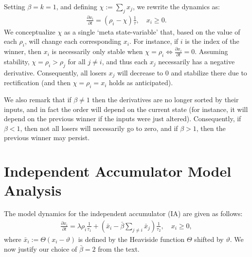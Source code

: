 \documentclass[a4paper]{article}
\begin{document}
Setting $\beta = k = 1$, and defining $\chi := \sum_j x_j$, we rewrite the dynamics as:
\begin{equation} \label{eq:um-special}
    \begin{split}
        \frac{{\partial x}_i}{\partial t} = \left(\rho_i - \chi \right) \frac{1}{\tau}, \quad x_i \ge 0.
    \end{split}
\end{equation}
We conceptualize $\chi$ as a single `meta state-variable' that, based on the value of each $\rho_i$, will change each corresponding $x_i$.
For instance, if $i$ is the index of the winner, then $x_i$ is necessarily only stable when $\chi = \rho_i \iff \frac{{\partial x}_i}{\partial t} = 0$.
Assuming stability, $\chi = \rho_i > \rho_j$ for all $j \ne i$, and thus each $x_j$ necessarily has a negative derivative.
Consequently, all losers $x_j$ will decrease to 0 and stabilize there due to rectification (and then $\chi = \rho_i = x_i$ holds as anticipated).

We also remark that if $\beta \ne 1$ then the derivatives are no longer sorted by their inputs, and in fact the order will depend on the current state (for instance, it will depend on the previous winner if the inputs were just altered). Consequently, if $\beta < 1$, then not all losers will necessarily go to zero, and if $\beta > 1$, then the previous winner may persist.

\section{Independent Accumulator Model Analysis}

The model dynamics for the independent accumulator (IA) are given as follows:
\begin{equation}
    \begin{split}
        \frac{{\partial x}_i}{\partial t} = \lambda \rho_i \frac{1}{\tau_1} + \left( 
            \bar{x}_i - \bar{\beta} \sum_{j \neq i} \bar{x}_j \right) \frac{1}{\tau_2}, \quad x_i \ge 0 ,
    \end{split}
\end{equation}
where $\bar{x}_i := \Theta(x_i - \vartheta)$ is defined by the Heaviside function $\Theta$ shifted by $\vartheta$.
We now justify our choice of $\bar{\beta} = 2$ from the text. %
\end{document}
